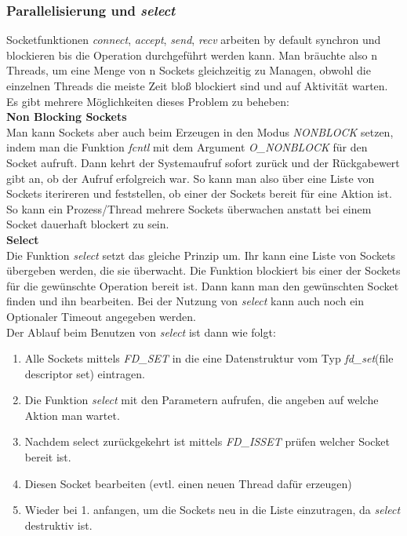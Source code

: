 \subsubsection{Parallelisierung und \textit{select}}
Socketfunktionen \textit{connect}, \textit{accept}, \textit{send}, \textit{recv} arbeiten by default synchron und blockieren bis die Operation durchgeführt werden kann. Man bräuchte also n Threads, um eine Menge von n Sockets gleichzeitig zu Managen, obwohl die einzelnen Threads die meiste Zeit bloß blockiert sind und auf Aktivität warten. Es gibt mehrere Möglichkeiten dieses Problem zu beheben:\\
\textbf{Non Blocking Sockets}\\
Man kann Sockets aber auch beim Erzeugen in den Modus \textit{NONBLOCK} setzen, indem man die Funktion \textit{fcntl} mit dem Argument \textit{O\_NONBLOCK} für den Socket aufruft. Dann kehrt der Systemaufruf sofort zurück und der Rückgabewert gibt an, ob der Aufruf erfolgreich war.
So kann man also über eine Liste von Sockets iterireren und feststellen, ob einer der Sockets bereit für eine Aktion ist. So kann ein Prozess/Thread mehrere Sockets überwachen anstatt bei einem Socket dauerhaft blockert zu sein.\\
\textbf{Select}\\
Die Funktion \textit{select} setzt das gleiche Prinzip um. Ihr kann eine Liste von Sockets übergeben werden, die sie überwacht. Die Funktion blockiert bis einer der Sockets für die gewünschte Operation bereit ist. Dann kann man den gewünschten Socket finden und ihn bearbeiten. Bei der Nutzung von \textit{select} kann auch noch ein Optionaler Timeout angegeben werden.\\
Der Ablauf beim Benutzen von \textit{select} ist dann wie folgt:\\
\begin{enumerate}
    \item Alle Sockets mittels \textit{FD\_SET} in die eine Datenstruktur vom Typ \textit{fd\_set}(file descriptor set) eintragen.
    \item Die Funktion \textit{select} mit den Parametern aufrufen, die angeben auf welche Aktion man wartet.
    \item Nachdem select zurückgekehrt ist mittels \textit{FD\_ISSET} prüfen welcher Socket bereit ist.
    \item Diesen Socket bearbeiten (evtl. einen neuen Thread dafür erzeugen)
    \item Wieder bei 1. anfangen, um die Sockets neu in die Liste einzutragen, da \textit{select} destruktiv ist.
\end{enumerate}

